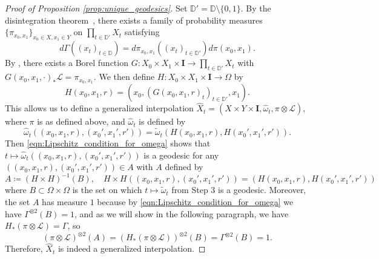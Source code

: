 \documentclass{article}
\theoremstyle{definition}
\begin{document}
\begin{proof}[Proof of Proposition \ref{prop:unique_geodesics}]
    Set $\mathbb{D}' = \mathbb{D} \setminus \{0,1\}$. By the disintegration theorem~\cite[Theorem A.1]{BrediesFanzon2020}, there exists a family of probability measures $\{\pi_{x_0,x_1}\}_{x_0\in X, x_1\in Y}$ on $\prod_{t \in \mathbb{D}'} X_t$ satisfying 
    \[
    d\Gamma((x_t)_{t \in \mathbb{D}}) = d\pi_{x_0,x_1}((x_t)_{t \in \mathbb{D}'})d\pi(x_0,x_1).
    \]
    By \cite[Lemma 3.2 (vii)]{kallenberg2002foundations}, there exists a Borel function $G:X_0\times X_1\times \mathbf{I} \to \prod_{t\in \mathbb{D}'} X_t$ with $G(x_0,x_1, \cdot)_* \mathscr{L} = \pi_{x_0,x_1}$. We then define $H: X_0\times X_1\times \mathbf{I} \to \Omega$ by 
    \begin{equation}
        H(x_0,x_1,r)= \left(x_0,\left(G(x_0,x_1,r)_t \right)_{t \in \mathbb{D}'} ,x_1 \right).
    \end{equation}
    This allows us to define a generalized interpolation $\widehat{X}_t = (X \times Y \times \mathbf{I}, \hat{\omega}_t, \pi \otimes \mathscr{L})$, where $\pi$ is as defined above, and $\hat{\omega}_t$ is defined by
    \begin{equation}
        \widehat{\omega}_t((x_0,x_1,r), (x_0',x_1',r')) = \tilde\omega_t(H(x_0,x_1,r), H(x_0',x_1',r')).
    \end{equation}
    Then \eqref{eqn:Lipschitz_condition_for_omega} shows that $t \mapsto \widehat{\omega}_t((x_0,x_1,r), (x_0',x_1',r'))$ is a geodesic for any $((x_0,x_1,r),(x_0',x_1',r'))\in A$ with $A$ defined by 
    \begin{equation}
    A \coloneqq (H\times H)^{-1}(B), \quad H\times H((x_0,x_1,r),(x_0',x_1',r')) = (H(x_0,x_1,r),H(x_0',x_1',r'))
    \end{equation}
    where $B \subset \Omega \times \Omega$ is the set on which $t\mapsto \tilde{\omega}_t$ from Step 3 is a geodesic. Moreover, the set $A$ has measure $1$ because by \eqref{eqn:Lipschitz_condition_for_omega} we have $\Gamma^{\otimes2}(B)=1$, and as we will show in the following paragraph, we have $H_*(\pi\otimes \mathscr{L})=\Gamma$, so 
    \begin{equation}
        (\pi\otimes \mathscr{L})^{\otimes 2}(A)=(H_*(\pi\otimes \mathscr{L}))^{\otimes 2}(B)= \Gamma^{\otimes 2}(B) = 1.
    \end{equation}
    Therefore, $\widehat{X}_t$ is indeed a generalized interpolation.
    
    

\end{proof}
\end{document}
